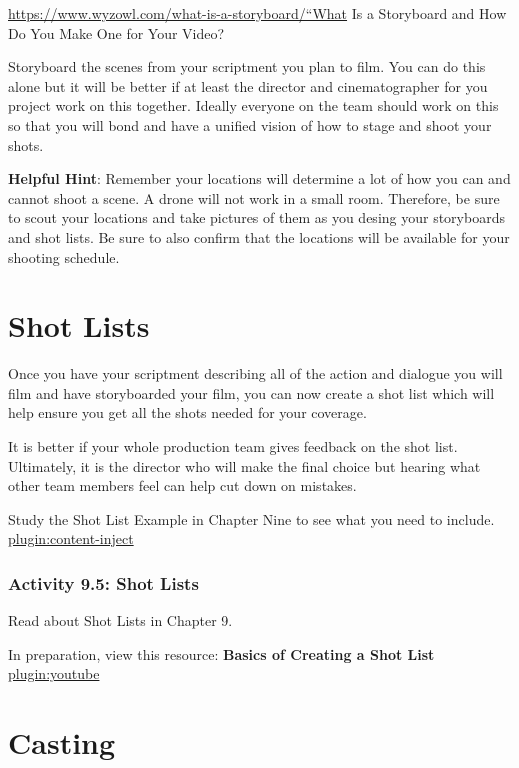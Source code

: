 \documentclass[
]{book}
\begin{document}
\url{https://www.wyzowl.com/what-is-a-storyboard/“What} Is a Storyboard and How Do You Make One for Your Video?

Storyboard the scenes from your scriptment you plan to film. You can do this alone but it will be better if at least the director and cinematographer for you project work on this together. Ideally everyone on the team should work on this so that you will bond and have a unified vision of how to stage and shoot your shots.

\textbf{Helpful Hint}: Remember your locations will determine a lot of how you can and cannot shoot a scene. A drone will not work in a small room. Therefore, be sure to scout your locations and take pictures of them as you desing your storyboards and shot lists. Be sure to also confirm that the locations will be available for your shooting schedule.

\hypertarget{shot-lists}{%
\section*{Shot Lists}\label{shot-lists}}

Once you have your scriptment describing all of the action and dialogue you will film and have storyboarded your film, you can now create a shot list which will help ensure you get all the shots needed for your coverage.

It is better if your whole production team gives feedback on the shot list. Ultimately, it is the director who will make the final choice but hearing what other team members feel can help cut down on mistakes.

Study the Shot List Example in Chapter Nine to see what you need to include.
\href{../_9-5}{plugin:content-inject}

\hypertarget{activity-9.5-shot-lists}{%
\subsubsection*{Activity 9.5: Shot Lists}\label{activity-9.5-shot-lists}}

Read about Shot Lists in Chapter 9.

In preparation, view this resource: \textbf{Basics of Creating a Shot List} \href{https://www.youtube.com/watch?v=-rzJP_5L_yQ}{plugin:youtube}

\hypertarget{casting}{%
\section*{Casting}\label{casting}}
\end{document}
